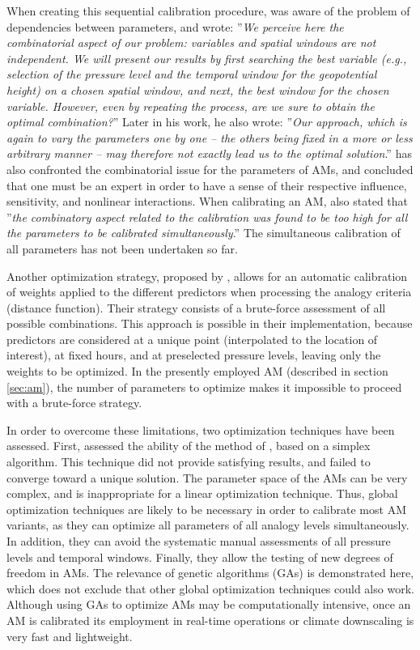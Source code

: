 \documentclass{ametsoc}
\begin{document}
When creating this sequential calibration procedure, \citet{Bontron2004} was aware of the problem of dependencies between parameters, and wrote: ''\textit{We perceive here the combinatorial aspect of our problem: variables and spatial windows are not independent. We will present our results by first searching the best variable (e.g., selection of the pressure level and the temporal window for the geopotential height) on a chosen spatial window, and next, the best window for the chosen variable. However, even by repeating the process, are we sure to obtain the optimal combination?}'' Later in his work, he also wrote: ''\textit{Our approach, which is again to vary the parameters one by one -- the others being fixed in a more or less arbitrary manner -- may therefore not exactly lead us to the optimal solution}.'' \citet{Bliefernicht2010} has also confronted the combinatorial issue for the parameters of AMs, and concluded that one must be an expert in order to have a sense of their respective influence, sensitivity, and nonlinear interactions. When calibrating an AM, \citet{BenDaoud2010} also stated that ''\textit{the combinatory aspect related to the calibration was found to be too high for all the parameters to be calibrated simultaneously}.'' The simultaneous calibration of all parameters has not been undertaken so far. 

Another optimization strategy, proposed by \citet{Junk2015}, allows for an automatic calibration of weights applied to the different predictors when processing the analogy criteria (distance function). Their strategy consists of a brute-force assessment of all possible combinations. This approach is possible in their implementation, because predictors are considered at a unique point (interpolated to the location of interest), at fixed hours, and at preselected pressure levels, leaving only the weights to be optimized. In the presently employed AM (described in section \ref{sec:am}), the number of parameters to optimize makes it impossible to proceed with a brute-force strategy.

In order to overcome these limitations, two optimization techniques have been assessed. First, \citet{Horton2012a} assessed the ability of the method of \citet{Nelder1965a}, based on a simplex algorithm. This technique did not provide satisfying results, and failed to converge toward a unique solution. The parameter space of the AMs can be very complex, and is inappropriate for a linear optimization technique. Thus, global optimization techniques are likely to be necessary in order to calibrate most AM variants, as they can optimize all parameters of all analogy levels simultaneously. In addition, they can avoid the systematic manual assessments of all pressure levels and temporal windows. Finally, they allow the testing of new degrees of freedom in AMs. The relevance of genetic algorithms (GAs) is demonstrated here, which does not exclude that other global optimization techniques could also work. Although using GAs to optimize AMs may be computationally intensive, once an AM is calibrated its employment in real-time operations or climate downscaling is very fast and lightweight.
\end{document}
